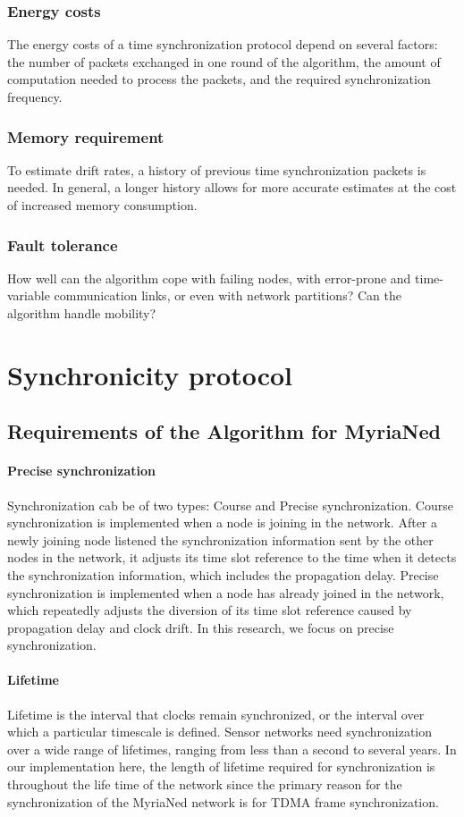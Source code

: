 \documentclass[a4paper,10pt]{report}
\begin{document}
\subsection{\textbf{Energy costs}}
The energy costs of a time synchronization protocol depend on several factors: the number of packets exchanged in one round of the algorithm, the amount of computation needed to process the packets, and the required synchronization frequency.
\subsection{\textbf{Memory requirement}}
To estimate drift rates, a history of previous time synchronization packets is needed. In general, a longer history allows for more accurate estimates at the cost of increased memory consumption. 
\subsection{\textbf{Fault tolerance}}
How well can the algorithm cope with failing nodes, with error-prone and time-variable communication links, or even with network partitions? Can the algorithm handle mobility?
\chapter{\textbf{Synchronicity protocol}}
\section{\textbf{Requirements of the Algorithm for MyriaNed}}
\subsubsection{\textbf{Precise synchronization}}
Synchronization cab be of two types: Course and Precise synchronization. Course synchronization is implemented when a node is joining in the network. After a newly joining node listened the synchronization information sent by the other nodes in the network, it adjusts its time slot reference to the time when it detects the synchronization information, which includes the propagation delay. Precise synchronization is implemented when a node has already joined in the network, which repeatedly adjusts the diversion of its time slot reference caused by propagation delay and clock drift. In this research, we focus on precise synchronization.
\subsubsection{\textbf{Lifetime}} Lifetime is the interval that clocks remain synchronized, or the interval over which a particular
timescale is defined. Sensor networks need synchronization over a wide range of lifetimes, ranging from less than a second to several
years. In our implementation here, the length of lifetime required for synchronization is throughout the life time of the network since
the primary reason for the synchronization of the MyriaNed network is for TDMA frame synchronization.
\end{document}
